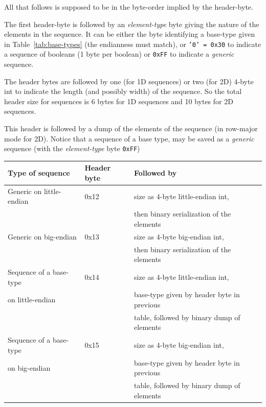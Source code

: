 \documentclass[11pt]{book}
\begin{document}
{All that follows is supposed to be in the byte-order implied by the header-byte.

The first header-byte is followed by an {\em element-type} byte giving the nature
of the elements in the sequence.  It can be either the byte identifying a
base-type given in Table~\ref{tab:base-types} (the endianness must match),
or {\tt '0' = 0x30} to indicate a sequence of booleans (1 byte per boolean) 
or {\tt 0xFF} to indicate a {\em generic} sequence.

The header bytes are followed by one (for 1D sequences) or two (for 2D)
4-byte int to indicate the length (and possibly width) of the sequence.
So the total header size for sequences is 6 bytes for 1D sequences and 10
bytes for 2D sequences.

This header is followed by a dump of the elements of the sequence (in
row-major mode for 2D).  Notice that a sequence of a base type, may be
saved as a {\em generic} sequence (with the {\em element-type} byte {\tt 0xFF})



\begin{tabular}{|l|l|l|} \hline
Type of sequence         & Header byte & Followed by \\ \hline
Generic on little-endian & 0x12        & size as 4-byte little-endian int, \\
                         &             & then binary serialization of the elements \\ \hline
Generic on big-endian    & 0x13        & size as 4-byte big-endian int, \\ 
                         &             & then binary serialization of the elements \\ \hline
Sequence of a base-type  & 0x14        & size as 4-byte little-endian int, \\ 
on little-endian         &             & base-type given by header byte in previous \\
                         &             & table, followed by binary dump of elements \\ \hline
Sequence of a base-type  & 0x15        & size as 4-byte big-endian int, \\ 
on big-endian            &             & base-type given by header byte in previous \\
                         &             & table, followed by binary dump of elements \\ \hline
\end{tabular}




}
\end{document}
